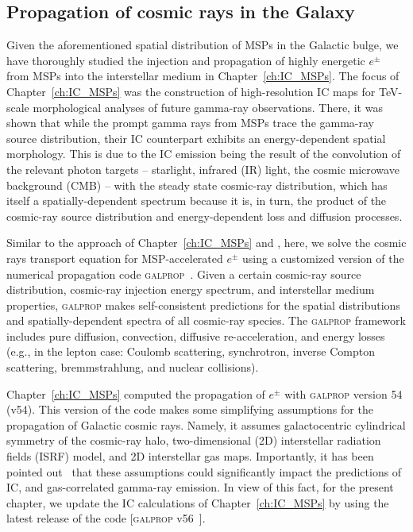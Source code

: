 \documentclass[doublespace,nopageskip]{VTthesis}
\begin{document}
\subsection{Propagation of cosmic rays in the Galaxy}
\label{subsec:propagation}

Given the aforementioned spatial distribution of MSPs in the Galactic bulge, we have thoroughly studied the injection and propagation of highly energetic $e^{\pm}$ from MSPs into the interstellar medium in Chapter~\ref{ch:IC_MSPs}. The focus of Chapter~\ref{ch:IC_MSPs} was the construction of high-resolution IC maps for TeV-scale morphological analyses of future gamma-ray observations. There, it was shown that while the prompt gamma rays from MSPs trace the gamma-ray source distribution, their IC counterpart exhibits an energy-dependent spatial morphology. This is due to the IC emission being the result of 
the convolution of the relevant photon targets -- starlight, infrared (IR) light, the cosmic microwave background (CMB) -- with the
steady state cosmic-ray distribution, which has itself 
a spatially-dependent spectrum because it is, in turn, the product of the cosmic-ray source distribution and energy-dependent loss and diffusion processes.


Similar to the approach of Chapter~\ref{ch:IC_MSPs} and \citet{2020JCAP...01..003I}, here, we solve the cosmic rays transport equation for MSP-accelerated $e^{\pm}$ using a customized version of the numerical propagation code \textsc{galprop}~\citep{2006ApJ...648L..29P,2007ARNPS..57..285S}. Given a certain cosmic-ray source distribution, cosmic-ray injection energy spectrum, and interstellar medium properties, \textsc{galprop} makes self-consistent predictions for the spatial distributions and spatially-dependent spectra of all cosmic-ray species. The \textsc{galprop} framework includes pure diffusion, convection, diffusive re-acceleration, and energy losses (e.g., in the lepton case: Coulomb scattering, synchrotron, inverse Compton scattering, bremmstrahlung,  and nuclear collisions). 


Chapter~\ref{ch:IC_MSPs} computed the propagation of $e^{\pm}$ with \textsc{galprop} version 54 (v54). This version of the code makes some simplifying assumptions for the propagation of Galactic cosmic rays. Namely, it  assumes galactocentric cylindrical symmetry of the cosmic-ray halo, two-dimensional (2D) interstellar radiation fields (ISRF) model, and 2D interstellar gas maps. Importantly, it has been pointed out~\citep{2017ApJ...846...67P,2018ApJ...856...45J} that these assumptions could significantly impact the predictions of IC, and gas-correlated gamma-ray emission. In view of this fact, for the present chapter, we update the IC calculations of Chapter~\ref{ch:IC_MSPs} by using the latest release of the code [\textsc{galprop} v56~\citep{2017ApJ...846...67P,2018ApJ...856...45J}].    
\end{document}
